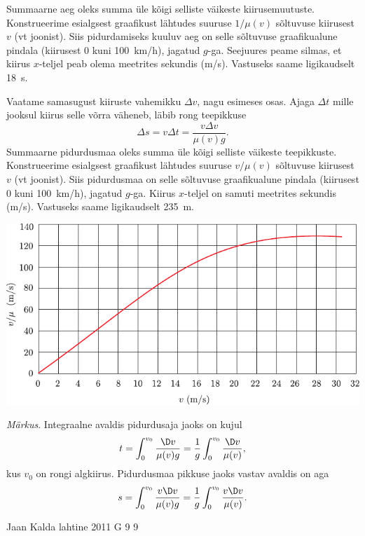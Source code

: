 \documentclass[11pt, twoside]{article}
\begin{document}
{{Summaarne aeg oleks summa üle kõigi selliste väikeste kiirusemuutuste. Konstrueerime esialgsest graafikust lähtudes suuruse $1/\mu (v)$ sõltuvuse kiirusest $v$ (vt joonist). Siis pidurdamiseks kuuluv aeg on selle sõltuvuse graafikualune pindala (kiirusest \num{0} kuni \SI{100}{km/h}), jagatud $g$-ga. Seejuures peame silmas, et kiirus $x$-teljel peab olema meetrites sekundis (\si{m/s}). Vastuseks saame ligikaudselt \SI{18}{s}.

\osa Vaatame samasugust kiiruste vahemikku $\Delta v$, nagu esimeses osas. Ajaga $\Delta t$ mille jooksul kiirus selle võrra väheneb, läbib rong teepikkuse
\[
\Delta s = v\Delta t = \frac{v\Delta v}{\mu (v)g}.
\]
Summaarne pidurdusmaa oleks summa üle kõigi selliste väikeste teepikkuste. Konstrueerime esialgsest graafikust lähtudes suuruse $v/\mu (v)$ sõltuvuse kiirusest $v$ (vt joonist). Siis pidurdusmaa on selle sõltuvuse graafikualune pindala (kiirusest \num{0} kuni \SI{100}{km/h}), jagatud $g$-ga. Kiirus $x$-teljel on samuti meetrites sekundis (\si{m/s}). Vastuseks saame ligikaudselt \SI{235}{m}.

\begin{center}
	\includegraphics[width=\linewidth]{2006-lahg-10-lah2}
\end{center}

\emph{Märkus}. Integraalne avaldis pidurdusaja jaoks on kujul
\[
t=\int_{0}^{v_{0}} \frac{\D v}{\mu(v) g}=\frac{1}{g} \int_{0}^{v_{0}} \frac{\D v}{\mu(v)},
\]
kus $v_0$ on rongi algkiirus. Pidurdusmaa pikkuse jaoks vastav avaldis on aga
\[
s=\int_{0}^{v_{0}} \frac{v \D v}{\mu(v) g}=\frac{1}{g} \int_{0}^{v_{0}} \frac{v \D v}{\mu(v)}.
\]
\fi
}

{Jaan Kalda} %
{lahtine} %
{2011} %
{G 9} %
{9} %
{

}}
\end{document}
